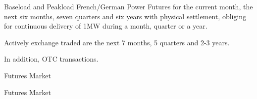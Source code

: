 	Baseload and Peakload French/German Power Futures for the current month, the next six months, seven quarters and six years with physical settlement, obliging for continuous delivery of 1MW during a month, quarter or a year.

	Actively exchange traded are the next 7 months, 5 quarters and 2-3 years.

	In addition, OTC transactions.






{Futures Market}



{Futures Market}


